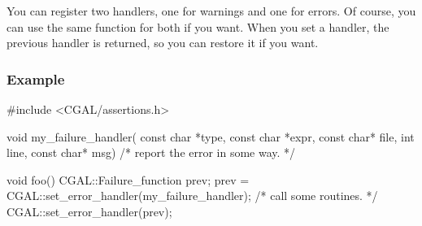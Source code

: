 \begin{ccAdvanced}
You can register two handlers, one for warnings and one for errors.
Of course, you can use the same function for both if you want.
When you set a handler, the previous handler is returned, so you can restore
it if you want.


\ccGlueBegin
{}

\ccGlueEnd

\subsubsection{Example}

\begin{cprog}
#include <CGAL/assertions.h>

void my_failure_handler(
    const char *type,
    const char *expr,
    const char* file,
    int line,
    const char* msg)
{
    /* report the error in some way. */
}

void foo()
{
    CGAL::Failure_function prev;
    prev = CGAL::set_error_handler(my_failure_handler);
    /* call some routines. */
    CGAL::set_error_handler(prev);
}
\end{cprog}

\end{ccAdvanced}


